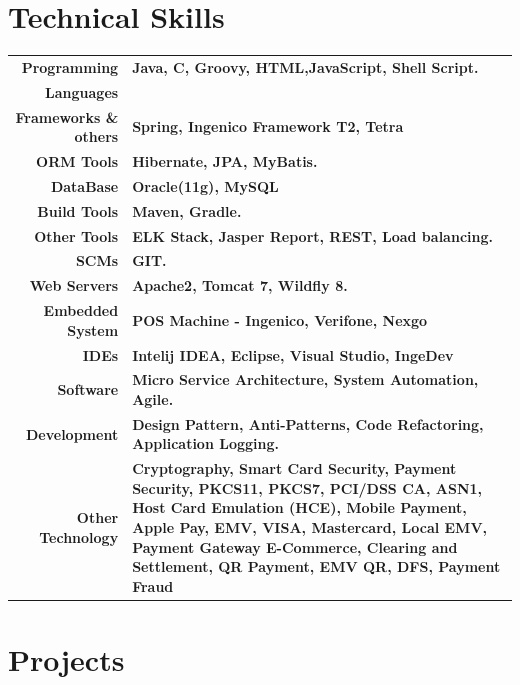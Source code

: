 \documentclass[a4paper,10pt]{article}
\begin{document}
\section*{Technical Skills}

\begin{tabular}{r|p{12.5cm}}
	\textbf{Programming}				&\textbf{Java, C, Groovy, HTML,JavaScript, Shell Script.} \\
	\textbf{Languages}					&\\
	\textbf{Frameworks \& others}		&\textbf{Spring, Ingenico Framework T2, Tetra} \\
	\textbf{ORM Tools}					&\textbf{Hibernate, JPA, MyBatis.} \\
	\textbf{DataBase}					&\textbf{Oracle(11g), MySQL} \\
	\textbf{Build Tools}				&\textbf{Maven, Gradle.} \\
	\textbf{Other Tools}				&\textbf{ELK Stack, Jasper Report, REST, Load balancing.} \\
	\textbf{SCMs}						&\textbf{GIT.} \\
	\textbf{Web Servers}				&\textbf{ Apache2, Tomcat 7, Wildfly 8.} \\
	\textbf{Embedded System}			&\textbf{ POS Machine - Ingenico, Verifone, Nexgo} \\
	\textbf{IDEs}						&\textbf{Intelij IDEA, Eclipse, Visual Studio, IngeDev} \\
	\textbf{Software}					&\textbf{Micro Service Architecture, System Automation, Agile.}\\
	\textbf{Development}				&\textbf{Design Pattern, Anti-Patterns, Code Re­factoring, Application Logging.} \\
	\textbf{Other Technology}			&\textbf{Cryptography, Smart Card Security, Payment Security, PKCS11, PKCS7, PCI/DSS CA, ASN1, Host Card Emulation (HCE), Mobile Payment, Apple Pay, EMV, VISA, Mastercard, Local EMV, Payment Gateway E-Commerce, Clearing and Settlement, QR Payment, EMV QR, DFS, Payment Fraud} \\
    
\end{tabular}
\section*{Projects}
\end{document}
